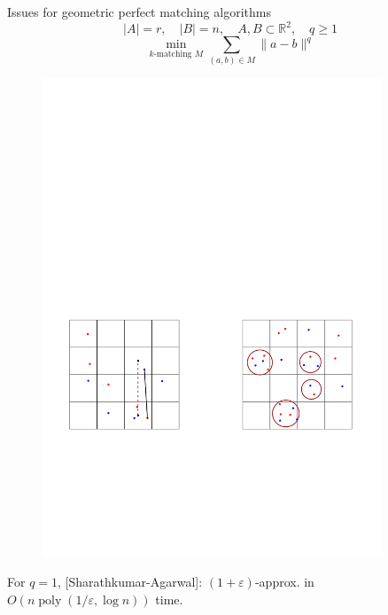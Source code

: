 \documentclass[xcolor={dvipsnames,usenames}]{beamer}
\newcommand{\reals}{\mathbb{R}}
\newcommand{\eps}{\varepsilon}
\DeclareMathOperator{\poly}{poly}
\begin{document}
\begin{frame}{Issues for geometric perfect matching algorithms}
\begin{equation*}
|A| = r, \quad |B| = n, \quad A, B \subset \reals^2, \quad q \geq 1
\end{equation*}
\begin{equation*}
\min_{k \text{-matching } M}\sum_{(a, b) \in M} \|a - b\|^q
\end{equation*}
\vspace{-10pt}
\begin{figure}
\begin{center}
\includegraphics[width=0.9\textwidth,page=1]{perf_geom_issues}%
\end{center}
\end{figure}
\vspace{-5pt}
{\small For $q = 1$, [Sharathkumar-Agarwal]: $(1+\eps)$-approx. in $O(n\poly(1/\eps, \log n))$ time.}
\end{frame}
\end{document}
